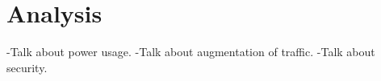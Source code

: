\section{Analysis}

-Talk about power usage.
-Talk about augmentation of traffic.
-Talk about security.
